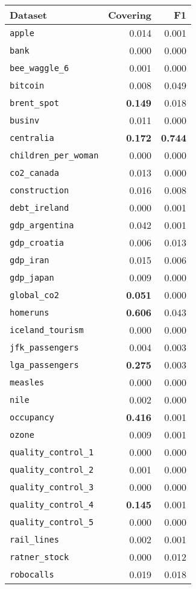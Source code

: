 \begin{tabular}{lrr}
Dataset & Covering & F1\\
\toprule
\verb+apple+ & 0.014 & 0.001\\
\verb+bank+ & 0.000 & 0.000\\
\verb+bee_waggle_6+ & 0.001 & 0.000\\
\verb+bitcoin+ & 0.008 & 0.049\\
\verb+brent_spot+ & \textbf{0.149} & 0.018\\
\verb+businv+ & 0.011 & 0.000\\
\verb+centralia+ & \textbf{0.172} & \textbf{0.744}\\
\verb+children_per_woman+ & 0.000 & 0.000\\
\verb+co2_canada+ & 0.013 & 0.000\\
\verb+construction+ & 0.016 & 0.008\\
\verb+debt_ireland+ & 0.000 & 0.001\\
\verb+gdp_argentina+ & 0.042 & 0.001\\
\verb+gdp_croatia+ & 0.006 & 0.013\\
\verb+gdp_iran+ & 0.015 & 0.006\\
\verb+gdp_japan+ & 0.009 & 0.000\\
\verb+global_co2+ & \textbf{0.051} & 0.000\\
\verb+homeruns+ & \textbf{0.606} & 0.043\\
\verb+iceland_tourism+ & 0.000 & 0.000\\
\verb+jfk_passengers+ & 0.004 & 0.003\\
\verb+lga_passengers+ & \textbf{0.275} & 0.003\\
\verb+measles+ & 0.000 & 0.000\\
\verb+nile+ & 0.002 & 0.000\\
\verb+occupancy+ & \textbf{0.416} & 0.001\\
\verb+ozone+ & 0.009 & 0.001\\
\verb+quality_control_1+ & 0.000 & 0.000\\
\verb+quality_control_2+ & 0.001 & 0.000\\
\verb+quality_control_3+ & 0.000 & 0.000\\
\verb+quality_control_4+ & \textbf{0.145} & 0.001\\
\verb+quality_control_5+ & 0.000 & 0.000\\
\verb+rail_lines+ & 0.002 & 0.001\\
\verb+ratner_stock+ & 0.000 & 0.012\\
\verb+robocalls+ & 0.019 & 0.018\\

\end{tabular}
